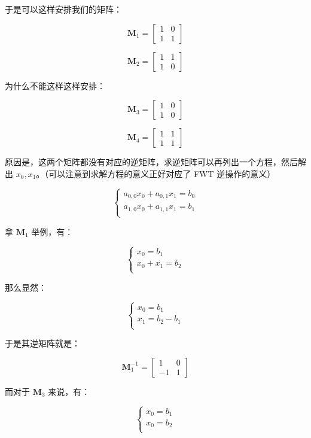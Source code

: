 \documentclass{article}
\begin{document}
于是可以这样安排我们的矩阵：

$$\mathbf{M}_1=\begin{bmatrix} 1 & 0 \\ 1 & 1 \end{bmatrix}$$

$$\mathbf{M}_2=\begin{bmatrix} 1 & 1 \\ 1 & 0 \end{bmatrix}$$

为什么不能这样这样安排：

$$\mathbf{M}_3=\begin{bmatrix} 1 & 0 \\ 1 & 0 \end{bmatrix}$$

$$\mathbf{M}_4=\begin{bmatrix} 1 & 1 \\ 1 & 1 \end{bmatrix}$$

原因是，这两个矩阵都没有对应的逆矩阵，求逆矩阵可以再列出一个方程，然后解出 $x_0,x_1$。（可以注意到求解方程的意义正好对应了 FWT 逆操作的意义）

$$
\begin{cases}
    a_{0,0}x_0 + a_{0,1}x_1 =b_0 \\
    a_{1,0}x_0 + a_{1,1}x_1 =b_1 \\
\end{cases}
$$

拿 $\mathbf{M}_1$ 举例，有：

$$
\begin{cases}
    x_0 = b_1 \\
    x_0 + x_1 =b_2 \\
\end{cases}
$$

那么显然：

$$
\begin{cases}
    x_0 = b_1 \\
    x_1 = b_2-b_1 \\
\end{cases}
$$

于是其逆矩阵就是：

$$\mathbf{M}_1^{-1}=\begin{bmatrix} 1 & 0 \\ -1 & 1 \end{bmatrix}$$

而对于 $\mathbf{M}_3$ 来说，有：

$$
\begin{cases}
    x_0 = b_1 \\
    x_0 = b_2 \\
\end{cases}
$$
\end{document}
